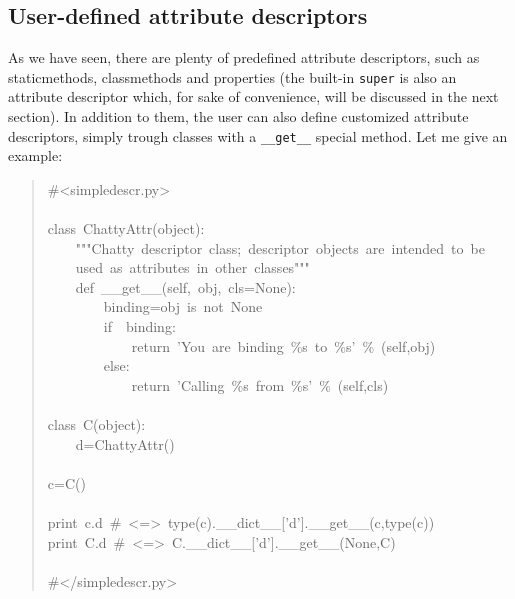 \documentclass[10pt,english]{article}
\begin{document}

\hypertarget{user-defined-attribute-descriptors}{}
\subsection*{User-defined attribute descriptors}

As we have seen, there are plenty of predefined attribute descriptors,
such as staticmethods, classmethods and properties (the built-in
\texttt{super} is also an attribute descriptor which, for sake of
convenience, will be discussed in the next section).
In addition to them, the user can also define customized attribute 
descriptors, simply trough classes with a \texttt{{\_}{\_}get{\_}{\_}} special method.
Let me give an example:
\begin{quote}
\begin{ttfamily}\begin{flushleft}
\mbox{{\#}<simpledescr.py>}\\
\mbox{}\\
\mbox{class~ChattyAttr(object):}\\
\mbox{~~~~"""Chatty~descriptor~class;~descriptor~objects~are~intended~to~be~}\\
\mbox{~~~~used~as~attributes~in~other~classes"""}\\
\mbox{~~~~def~{\_}{\_}get{\_}{\_}(self,~obj,~cls=None):}\\
\mbox{~~~~~~~~binding=obj~is~not~None}\\
\mbox{~~~~~~~~if~~binding:}\\
\mbox{~~~~~~~~~~~~return~'You~are~binding~{\%}s~to~{\%}s'~{\%}~(self,obj)}\\
\mbox{~~~~~~~~else:}\\
\mbox{~~~~~~~~~~~~return~'Calling~{\%}s~from~{\%}s'~{\%}~(self,cls)}\\
\mbox{}\\
\mbox{class~C(object):}\\
\mbox{~~~~d=ChattyAttr()}\\
\mbox{}\\
\mbox{c=C()}\\
\mbox{}\\
\mbox{print~c.d~{\#}~<=>~type(c).{\_}{\_}dict{\_}{\_}['d'].{\_}{\_}get{\_}{\_}(c,type(c))}\\
\mbox{print~C.d~{\#}~<=>~C.{\_}{\_}dict{\_}{\_}['d'].{\_}{\_}get{\_}{\_}(None,C)}\\
\mbox{}\\
\mbox{{\#}</simpledescr.py>}
\end{flushleft}\end{ttfamily}
\end{quote}
\end{document}
